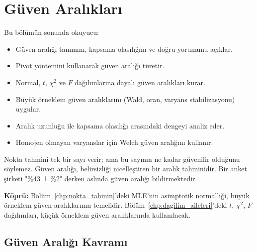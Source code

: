 \chapter{Güven Aralıkları}
\label{chp:guven_araliklari}


\begin{kazanimlar}
Bu bölümün sonunda okuyucu:
\begin{itemize}
  \item Güven aralığı tanımını, kapsama olasılığını ve doğru yorumunu açıklar.
  \item Pivot yöntemini kullanarak güven aralığı türetir.
  \item Normal, $t$, $\chi^2$ ve $F$ dağılımlarına dayalı güven aralıkları kurar.
  \item Büyük örneklem güven aralıklarını (Wald, oran, varyans stabilizasyonu) uygular.
  \item Aralık uzunluğu ile kapsama olasılığı arasındaki dengeyi analiz eder.
  \item Homojen olmayan varyanslar için Welch güven aralığını kullanır.
\end{itemize}
\end{kazanimlar}

\begin{motivasyon}
Nokta tahmini tek bir sayı verir; ama bu sayının ne kadar güvenilir olduğunu söylemez. Güven aralığı, belirsizliği nicelleştiren bir aralık tahminidir. Bir anket şirketi "\%43 ± \%2" derken aslında güven aralığı bildirmektedir.

\medskip
\noindent\textbf{Köprü:} Bölüm~\ref{chp:nokta_tahmin}'deki MLE'nin asimptotik normalliği, büyük örneklem güven aralıklarının temelidir. Bölüm~\ref{chp:dagilim_aileleri}'deki $t$, $\chi^2$, $F$ dağılımları, küçük örneklem güven aralıklarında kullanılacak.
\end{motivasyon}

\section{Güven Aralığı Kavramı}
\label{sec:ga_kavram}

